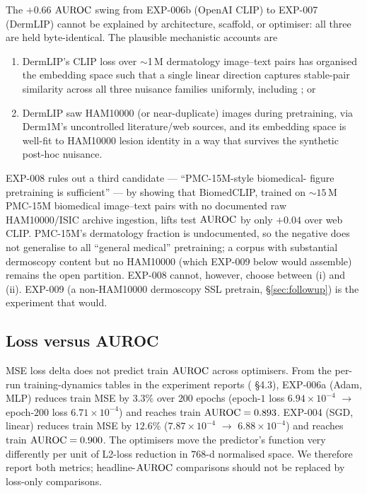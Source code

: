 The $+0.66$ $\mathrm{AUROC}$ swing from EXP-006b (OpenAI CLIP) to EXP-007 (DermLIP)
cannot be explained by architecture, scaffold, or optimiser: all three are
held byte-identical. The plausible mechanistic accounts are
\begin{enumerate}[label=(\roman*)]
\item DermLIP's CLIP loss over $\sim$1\,M dermatology image--text pairs has
      organised the embedding space such that a single linear direction
      captures stable-pair similarity across all three nuisance families
      uniformly, including \strongholdtwo; or
\item DermLIP saw HAM10000 (or near-duplicate) images during pretraining,
      via Derm1M's uncontrolled literature/web sources, and its
      embedding space is well-fit to HAM10000 lesion identity in a way that
      survives the synthetic post-hoc nuisance.
\end{enumerate}
EXP-008 rules out a third candidate --- ``PMC-15M-style biomedical-
figure pretraining is sufficient'' --- by showing that BiomedCLIP,
trained on $\sim$$15$\,M PMC-15M biomedical image--text pairs with no
documented raw HAM10000/ISIC archive ingestion, lifts test $\mathrm{AUROC}$ by
only $+0.04$ over web CLIP. PMC-15M's
dermatology fraction is undocumented, so the negative does not
generalise to all ``general medical'' pretraining; a corpus with
substantial dermoscopy content but no HAM10000 (which EXP-009 below
would assemble) remains the open partition. EXP-008 cannot, however,
choose between (i) and (ii). EXP-009 (a
non-HAM10000 dermoscopy SSL pretrain, \S\ref{sec:followup}) is the
experiment that would.

\subsection{Loss versus AUROC}
\label{sec:analysis:loss-vs-auroc}

MSE loss delta does not predict train $\mathrm{AUROC}$ across optimisers.
From the per-run training-dynamics tables in the experiment reports
( \S4.3), EXP-006a (Adam,
MLP) reduces train MSE by $3.3\%$ over $200$ epochs (epoch-$1$ loss
$6.94 \!\times\! 10^{-4}$ $\to$ epoch-$200$ loss $6.71 \!\times\!
10^{-4}$) and reaches train $\mathrm{AUROC} = 0.893$. EXP-004 (SGD, linear)
reduces train MSE by $12.6\%$ ($7.87 \!\times\! 10^{-4}$ $\to$
$6.88 \!\times\! 10^{-4}$) and reaches train $\mathrm{AUROC} = 0.900$. The
optimisers move the predictor's function very differently per unit of
L2-loss reduction in $768$-d normalised space. We therefore report
both metrics; headline-$\mathrm{AUROC}$ comparisons should not be replaced by
loss-only comparisons.


